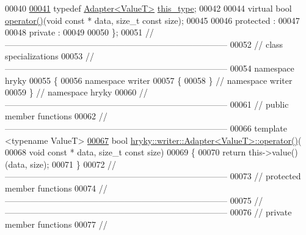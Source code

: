 \begin{DoxyCode}
00040 
\hypertarget{writer__adapter_8h_source_l00041}{}\hyperlink{classhryky_1_1writer_1_1_adapter_a9fe895f62ad5d6fa98ea5264772b6a26}{00041}     \textcolor{keyword}{typedef} \hyperlink{classhryky_1_1writer_1_1_adapter}{Adapter<ValueT>} \hyperlink{classhryky_1_1writer_1_1_adapter_a9fe895f62ad5d6fa98ea5264772b6a26}{this_type};
00042 
00044     \textcolor{keyword}{virtual} \textcolor{keywordtype}{bool} \hyperlink{classhryky_1_1writer_1_1_adapter_a6078dbc44e91c1ec4f4e6ddc62aac4be}{operator()}(\textcolor{keywordtype}{void} \textcolor{keyword}{const} * data, \textcolor{keywordtype}{size\_t} \textcolor{keyword}{const} size);
00045 
00046 \textcolor{keyword}{protected} :
00047 
00048 \textcolor{keyword}{private} :
00049 
00050 \};
00051 \textcolor{comment}{//
      ------------------------------------------------------------------------------}
00052 \textcolor{comment}{// class specializations}
00053 \textcolor{comment}{//
      ------------------------------------------------------------------------------}
00054 \textcolor{keyword}{namespace }hryky
00055 \{
00056 \textcolor{keyword}{namespace }writer
00057 \{
00058 \} \textcolor{comment}{// namespace writer}
00059 \} \textcolor{comment}{// namespace hryky}
00060 \textcolor{comment}{//
      ------------------------------------------------------------------------------}
00061 \textcolor{comment}{// public member functions}
00062 \textcolor{comment}{//
      ------------------------------------------------------------------------------}
00066 \textcolor{comment}{}\textcolor{keyword}{template} <\textcolor{keyword}{typename} ValueT>
\hypertarget{writer__adapter_8h_source_l00067}{}\hyperlink{classhryky_1_1writer_1_1_adapter_a6078dbc44e91c1ec4f4e6ddc62aac4be}{00067} \textcolor{keywordtype}{bool} \hyperlink{classhryky_1_1writer_1_1_adapter_a6078dbc44e91c1ec4f4e6ddc62aac4be}{hryky::writer::Adapter<ValueT>::operator()}(
00068     \textcolor{keywordtype}{void} \textcolor{keyword}{const} * data, \textcolor{keywordtype}{size\_t} \textcolor{keyword}{const} size)
00069 \{
00070     \textcolor{keywordflow}{return} this->value()(data, size);
00071 \}
00072 \textcolor{comment}{//
      ------------------------------------------------------------------------------}
00073 \textcolor{comment}{// protected member functions}
00074 \textcolor{comment}{//
      ------------------------------------------------------------------------------}
00075 \textcolor{comment}{//
      ------------------------------------------------------------------------------}
00076 \textcolor{comment}{// private member functions}
00077 \textcolor{comment}{//
}
\end{DoxyCode}
